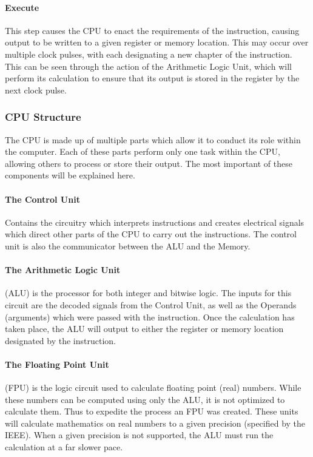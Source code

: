 \documentclass[a4paper,11pt]{report}
\begin{document}
				\paragraph{Execute}
					This step causes the CPU to enact the requirements of the instruction, causing output to be written to a given register or memory location. 
					This may occur over multiple clock pulses, with each designating a new chapter of the instruction. 
					This can be seen through the action of the Arithmetic Logic Unit, which will perform its calculation to ensure that its output is stored in the register by the next clock pulse. 
			\subsubsection{CPU Structure}
				The CPU is made up of multiple parts which allow it to conduct its role within the computer. 
				Each of these parts perform only one task within the CPU, allowing others to process or store their output. 
				The most important of these components will be explained here. 
				\paragraph{The Control Unit}
					Contains the circuitry which interprets instructions and creates electrical signals which direct other parts of the CPU to carry out the instructions. 
					The control unit is also the communicator between the ALU and the Memory.
				\paragraph{The Arithmetic Logic Unit}
					(ALU) is the processor for both integer and bitwise logic. 
					The inputs for this circuit are the decoded signals from the Control Unit, as well as the Operands (arguments) which were passed with the instruction. 
					Once the calculation has taken place, the ALU will output to either the register or memory location designated by the instruction. 
				\paragraph{The Floating Point Unit}
					(FPU) is the logic circuit used to calculate floating point (real) numbers. 
					While these numbers can be computed using only the ALU, it is not optimized to calculate them.
					Thus to expedite the process an FPU was created. 
					These units will calculate mathematics on real numbers to a given precision (specified by the IEEE). %
					When a given precision is not supported, the ALU must run the calculation at a far slower pace. 
\end{document}
